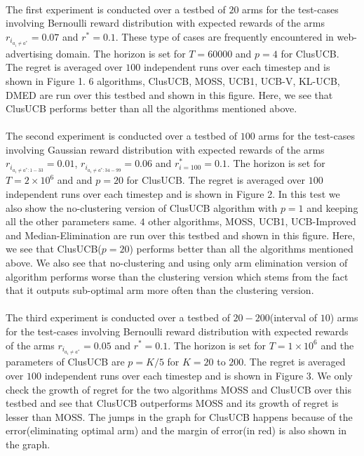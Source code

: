 \paragraph{}The first experiment is conducted over a testbed of $20$ arms for the test-cases involving Bernoulli reward distribution with expected rewards of the arms $r_{i_{a_{i}\neq a^{*}}}=0.07$ and $r^{*}=0.1$. These type of cases are frequently encountered in web-advertising domain. The horizon is set for $T=60000$ and $p=4$ for ClusUCB. The regret is averaged over $100$ independent runs over each timestep and is shown in Figure 1. $6$ algorithms, ClusUCB, MOSS, UCB1, UCB-V, KL-UCB, DMED are run over this testbed and shown in this figure. Here, we see that ClusUCB performs better than all the algorithms mentioned above.

\paragraph{}The second experiment is conducted over a testbed of $100$ arms for the test-cases involving Gaussian reward distribution with expected rewards of the arms $r_{i_{a_{i}\neq a^{*}:1-33}}=0.01$, $r_{i_{a_{i}\neq a^{*}:34-99}}=0.06$ and $r^{*}_{i=100}=0.1$. The horizon is set for $T=2\times 10^{6}$ and and $p=20$ for ClusUCB. The regret is averaged over $100$ independent runs over each timestep and is shown in Figure 2. In this test we also show the no-clustering version of ClusUCB algorithm with $p=1$ and keeping all the other parameters same. $4$ other algorithms, MOSS, UCB1, UCB-Improved and Median-Elimination are run over this testbed and shown in this figure. Here, we see that ClusUCB($p=20$) performs better than all the algorithms mentioned above. We also see that no-clustering and using only arm elimination version of algorithm performs worse than the clustering version which stems from the fact that it outputs sub-optimal arm more often than the clustering version.

\paragraph{}The third experiment is conducted over a testbed of $20-200$(interval of $10$) arms for the test-cases involving Bernoulli reward distribution with expected rewards of the arms $r_{i_{a_{i}\neq a^{*}}}=0.05$ and $r^{*}=0.1$. The horizon is set for $T=1\times 10^{6}$ and the parameters of ClusUCB are $p=K/5$ for $K=20$ to $200$. The regret is averaged over $100$ independent runs over each timestep and is shown in Figure 3. We only check the growth of regret for the two algorithms MOSS and ClusUCB over this testbed and see that ClusUCB outperforms MOSS and its growth of regret is lesser than MOSS. The jumps in the graph for ClusUCB happens because of the error(eliminating optimal arm) and the margin of error(in red) is also shown in the graph. 